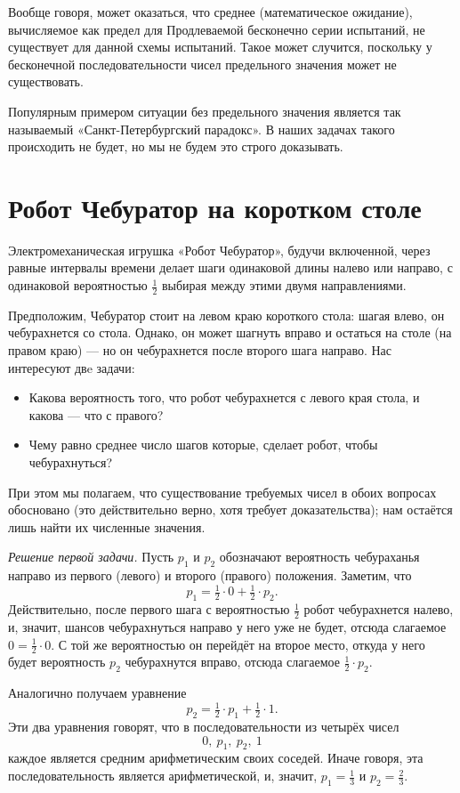 \documentclass{article}
\begin{document}
Вообще говоря, может оказаться, что среднее (математическое ожидание), вычисляемое как предел для
Продлеваемой бесконечно серии испытаний, не существует для данной схемы испытаний. Такое может случится,
поскольку у бесконечной последовательности чисел предельного значения может не существовать.

Популярным примером ситуации без предельного значения является так называемый «Санкт-Петербургский парадокс». 
В наших задачах такого происходить не будет,
но мы не будем это строго доказывать.

\section{Робот Чебуратор на коротком столе} 

Электромеханическая игрушка «Робот Чебуратор», 
будучи включенной, через равные интервалы времени делает шаги одинаковой длины налево или направо,
с одинаковой вероятностью $\tfrac12$ выбирая между этими двумя направлениями.

Предположим, Чебуратор стоит на левом краю короткого стола: шагая влево, он чебурахнется со стола.
Однако, он может шагнуть вправо и остаться на столе (на правом краю) --- но он чебурахнется после второго
шага направо. Нас интересуют двe задачи:
\begin{itemize}
\item Какова вероятность того, что робот чебурахнется с левого края стола, и какова --- что с правого?
\item Чему равно среднее число шагов которые, сделает робот, чтобы чебурахнуться?
\end{itemize}
При этом мы полагаем, что существование требуемых чисел в обоих вопросах обосновано
(это действительно верно, хотя требует доказательства); нам остаётся лишь найти их численные значения.

\medskip
\noindent\textit{Решение первой задачи.}
Пусть $p_1$ и $p_2$ обозначают вероятность чебураханья направо из первого (левого) и второго (правого) положения.
Заметим, что
\[p_1=\tfrac12\cdot0+\tfrac12\cdot p_2.\]
Действительно, после первого шага с вероятностью $\tfrac12$ робот чебурахнется налево,
и, значит, шансов чебурахнуться направо у него уже не будет, 
отсюда слагаемое $0=\tfrac12\cdot0$. С той же вероятностью он перейдёт на второе место,
откуда у него будет вероятность $p_2$ чебурахнутся вправо, отсюда слагаемое $\tfrac12\cdot p_2$.

Аналогично получаем уравнение 
\[p_2=\tfrac12\cdot p_1+\tfrac12\cdot 1.\]
Эти два уравнения говорят, что в последовательности из четырёх чисел
\[0,\  p_1,\  p_2,\ 1\]
каждое является средним арифметическим своих соседей.
Иначе говоря, эта последовательность является арифметической, 
и, значит, $p_1=\tfrac13$ и $p_2=\tfrac23$.
\end{document}
